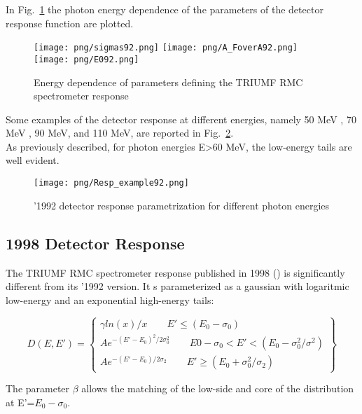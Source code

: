In Fig.~\ref{fig:parameterDependance} the photon energy dependence of the parameters of the detector response function are plotted.
\begin{figure}[!h]
 \begin{center}
 \texttt{[image: png/sigmas92.png]} 
 \texttt{[image: png/A\_FoverA92.png]} 
 \texttt{[image: png/E092.png]} 
 \end{center}
 \caption{
   Energy dependence of parameters defining the TRIUMF RMC spectrometer response
   \cite{RMC_1992_PhysRevC.46.1094}
 }
 \label{fig:parameterDependance}
 \end{figure}

Some examples of the detector response at different energies, namely 50 MeV , 70 MeV , 90 MeV, and 110 MeV,
 are reported in Fig.~\ref{fig:92ResponseExample}.\\
As previously described, for photon energies E>60 MeV, the low-energy tails are well evident.

\begin{figure}[!h]
\centering
\texttt{[image: png/Resp\_example92.png]}
\caption{'1992 detector response parametrization for different photon energies}
\label{fig:92ResponseExample}
\end{figure}


\subsection { 1998 Detector Response }

The TRIUMF RMC spectrometer response published in 1998 (\cite{RMC_1998_PhysRevC.58.1767}) is
significantly different from its '1992 version.
It s parameterized as a gaussian with logaritmic low-energy and an exponential
high-energy tails:

\begin{equation}
  D(E,E')= \left\{
    \begin{array}{ll}
      \gamma ln(x)/x          \qquad E' \leq (E_0-\sigma_0) \\
      Ae^{-(E'-E_0)^2/2\sigma_0^2} \qquad E0-\sigma_0<E'<(E_0-\sigma_0^2/\sigma^2) \\
      Ae^{-(E'-E_0)/2\sigma_2}    \qquad E' \geq (E_0+\sigma_0^2/\sigma_2)
    \end{array}
  \right\}
\end{equation}

The parameter $\beta$  allows the matching of the low-side and core of the distribution at E'=$E_0-\sigma_0$.

